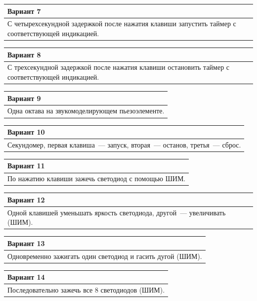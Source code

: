 \documentclass[main.tex]{subfiles}
\begin{document}
\begin{small}
\vspace{12px}
\noindent
\begin{tabularx}{\textwidth}{|X|}
\hline
\textbf{Вариант 7}\\
\hline
С четырехсекундной задержкой после нажатия клавиши запустить таймер с соответствующей индикацией.\\
\hline
\end{tabularx}

\vspace{12px}
\noindent
\begin{tabularx}{\textwidth}{|X|}
\hline
\textbf{Вариант 8}\\
\hline
С трехсекундной задержкой после нажатия клавиши остановить таймер с соответствующей индикацией.\\
\hline
\end{tabularx}

\vspace{12px}
\noindent
\begin{tabularx}{\textwidth}{|X|}
\hline
\textbf{Вариант 9}\\
\hline
Одна октава на звукомоделирующем пьезоэлементе.\\
\hline
\end{tabularx}

\vspace{12px}
\noindent
\begin{tabularx}{\textwidth}{|X|}
\hline
\textbf{Вариант 10}\\
\hline
Секундомер, первая клавиша~--- запуск, вторая~--- останов, третья~--- сброс.\\
\hline
\end{tabularx}

\vspace{12px}
\noindent
\begin{tabularx}{\textwidth}{|X|}
\hline
\textbf{Вариант 11}\\
\hline
По нажатию клавиши зажечь светодиод с помощью ШИМ.\\
\hline
\end{tabularx}

\vspace{12px}
\noindent
\begin{tabularx}{\textwidth}{|X|}
\hline
\textbf{Вариант 12}\\
\hline
Одной клавишей уменьшать яркость светодиода, другой~--- увеличивать (ШИМ).\\
\hline
\end{tabularx}

\vspace{12px}
\noindent
\begin{tabularx}{\textwidth}{|X|}
\hline
\textbf{Вариант 13}\\
\hline
Одновременно зажигать один светодиод и гасить дугой (ШИМ).\\
\hline
\end{tabularx}

\vspace{12px}
\noindent
\begin{tabularx}{\textwidth}{|X|}
\hline
\textbf{Вариант 14}\\
\hline
Последовательно зажечь все 8 светодиодов (ШИМ).\\
\hline
\end{tabularx}
\end{small}
\end{document}
